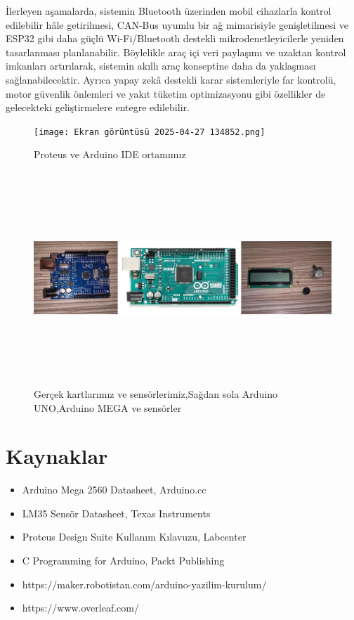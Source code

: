 \documentclass[conference]{IEEEtran}
\begin{document}
İlerleyen aşamalarda, sistemin Bluetooth üzerinden mobil cihazlarla kontrol edilebilir hâle getirilmesi, CAN-Bus uyumlu bir ağ mimarisiyle genişletilmesi ve ESP32 gibi daha güçlü Wi-Fi/Bluetooth destekli mikrodenetleyicilerle yeniden tasarlanması planlanabilir. Böylelikle araç içi veri paylaşımı ve uzaktan kontrol imkanları artırılarak, sistemin akıllı araç konseptine daha da yaklaşması sağlanabilecektir. Ayrıca yapay zekâ destekli karar sistemleriyle far kontrolü, motor güvenlik önlemleri ve yakıt tüketim optimizasyonu gibi özellikler de gelecekteki geliştirmelere entegre edilebilir.


\begin{figure}[H]
\centering
\texttt{[image: Ekran görüntüsü 2025-04-27 134852.png]}
\caption{Proteus ve Arduino IDE ortamımız}
\end{figure}



\begin{figure}[H]
\centering
\includegraphics[width=1.0\textwidth, height=8cm]{kullanicilan_bilesenler_collage.jpg}
\caption{Gerçek kartlarımız ve sensörlerimiz,Sağdan sola Arduino UNO,Arduino MEGA ve sensörler}
\end{figure}



\section*{Kaynaklar}
\begin{itemize}
      \item Arduino Mega 2560 Datasheet, Arduino.cc
      \item LM35 Sensör Datasheet, Texas Instruments
      \item Proteus Design Suite Kullanım Kılavuzu, Labcenter
      \item C Programming for Arduino, Packt Publishing
      \item https://maker.robotistan.com/arduino-yazilim-kurulum/
      \item https://www.overleaf.com/
\end{itemize}
\end{document}
